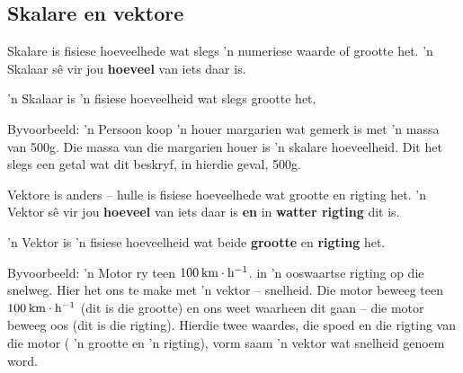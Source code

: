 \subsection*{Skalare en vektore}
            \nopagebreak

Skalare is fisiese hoeveelhede wat slegs  'n numeriese waarde of grootte het.  'n Skalaar s\^{e} vir jou \textbf{hoeveel} van iets daar is.  

 { 'n Skalaar is  'n fisiese hoeveelheid wat slegs grootte het.} 

Byvoorbeeld:  'n Persoon koop  'n houer margarien wat gemerk is met  'n massa van 500g. Die massa van die margarien houer is  'n skalare hoeveelheid. Dit het slegs een getal wat dit beskryf, in hierdie geval, 500g. 

Vektore is anders – hulle is fisiese hoeveelhede wat grootte en rigting het.  'n Vektor sê vir jou \textbf{hoeveel} van iets daar is \textbf{en} in \textbf{watter rigting} dit is.

 { 'n Vektor is  'n fisiese hoeveelheid wat beide \textbf{grootte} en \textbf{rigting} het.}



 

Byvoorbeeld:  'n Motor ry teen $100\phantom{\rule{2pt}{0ex}}\text{km}\ensuremath{\cdot}\text{h}{}^{-1}$. in  'n ooswaartse rigting op die snelweg. Hier het ons te make met  'n vektor – snelheid. Die motor beweeg teen $100\phantom{\rule{2pt}{0ex}}\text{km}\ensuremath{\cdot}\text{h}{}^{-1}$ (dit is die grootte) en ons weet waarheen dit gaan – die motor beweeg oos (dit is die rigting). Hierdie twee waardes, die spoed en die rigting van die motor ( 'n grootte en  'n rigting), vorm saam  'n vektor wat snelheid genoem word.

